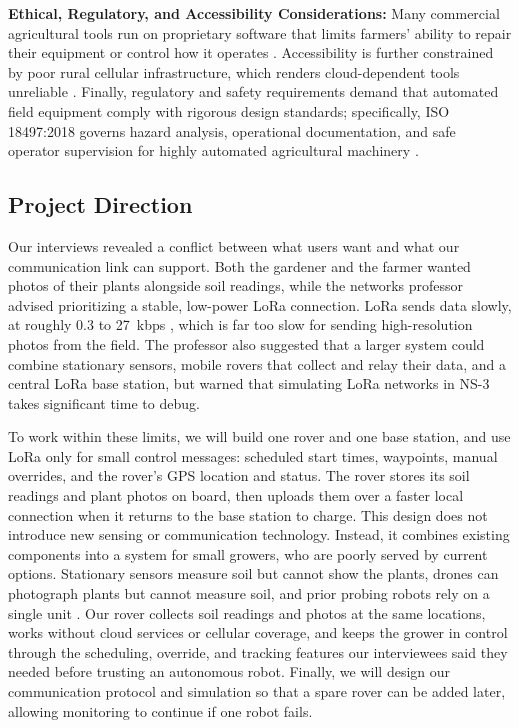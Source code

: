 \documentclass[12pt, letterpaper]{article}
\begin{document}
\textbf{Ethical, Regulatory, and Accessibility Considerations:} Many commercial agricultural tools run on proprietary software that limits farmers' ability to repair their equipment or control how it operates \cite{pirg2023}. Accessibility is further constrained by poor rural cellular infrastructure, which renders cloud-dependent tools unreliable \cite{instructables2017, shreyas2018, rehman2017}. Finally, regulatory and safety requirements demand that automated field equipment comply with rigorous design standards; specifically, ISO 18497:2018 governs hazard analysis, operational documentation, and safe operator supervision for highly automated agricultural machinery \cite{iso18497}.

\subsection{Project Direction}
Our interviews revealed a conflict between what users want and what our communication link can support. Both the gardener and the farmer wanted photos of their plants alongside soil readings, while the networks professor advised prioritizing a stable, low-power LoRa connection. LoRa sends data slowly, at roughly 0.3 to 27~kbps \cite{jawad2017}, which is far too slow for sending high-resolution photos from the field. The professor also suggested that a larger system could combine stationary sensors, mobile rovers that collect and relay their data, and a central LoRa base station, but warned that simulating LoRa networks in NS-3 takes significant time to debug.

To work within these limits, we will build one rover and one base station, and use LoRa only for small control messages: scheduled start times, waypoints, manual overrides, and the rover's GPS location and status. The rover stores its soil readings and plant photos on board, then uploads them over a faster local connection when it returns to the base station to charge. This design does not introduce new sensing or communication technology. Instead, it combines existing components into a system for small growers, who are poorly served by current options. Stationary sensors measure soil but cannot show the plants, drones can photograph plants but cannot measure soil, and prior probing robots rely on a single unit \cite{shreyas2018}. Our rover collects soil readings and photos at the same locations, works without cloud services or cellular coverage, and keeps the grower in control through the scheduling, override, and tracking features our interviewees said they needed before trusting an autonomous robot. Finally, we will design our communication protocol and simulation so that a spare rover can be added later, allowing monitoring to continue if one robot fails.
\end{document}
